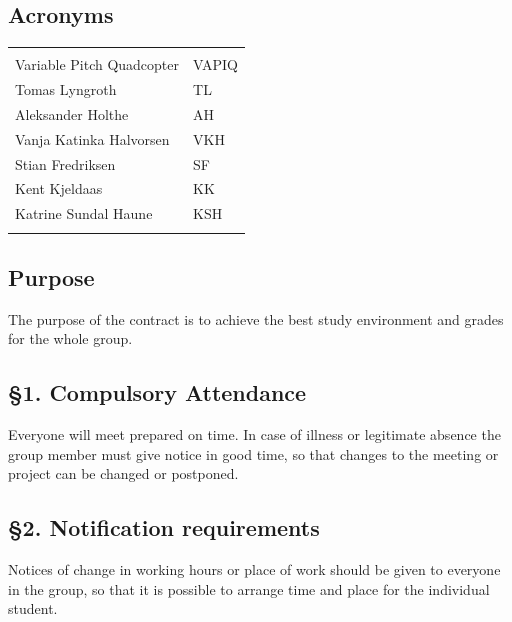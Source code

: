 \documentclass{article}
\begin{document}
\vspace*{3.0 cm}

\begin{center}
\section*{\textbf{Acronyms}}
\begin{tabular}{ll}
\rowcolor{cadetgrey}
    &   \\
Variable Pitch Quadcopter   & VAPIQ \\\rowcolor{gainsboro}
Tomas Lyngroth       & TL          \\ 
Aleksander Holthe      & AH          \\\rowcolor{gainsboro}
Vanja Katinka Halvorsen     & VKH   \\
Stian Fredriksen      & SF          \\\rowcolor{gainsboro}
Kent Kjeldaas         & KK          \\
Katrine Sundal Haune  & KSH         \\\rowcolor{gainsboro}
\end{tabular}                                                             
\end{center}
\newpage



\vspace*{1.0 cm}
\subsection*{Purpose}
The purpose of the contract is to achieve the best study environment and grades for the whole group.

\subsection*{§1. Compulsory Attendance}
Everyone will meet prepared on time. In case of illness or legitimate absence the group member must give notice in good time, so that changes to the meeting or project can be changed or postponed.

\subsection*{§2. Notification requirements}
Notices of change in working hours or place of work should be given to everyone in the group, so that it is possible to arrange time and place for the individual student.
\end{document}
